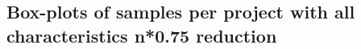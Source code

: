 \begin{appendices}
\chapter{Box-plots of samples per project with all characteristics n*0.75 reduction}
\label{ap:full_75}
\begin{figure}[h]
    \centering
    \qquad
\end{figure}


\end{appendices}
